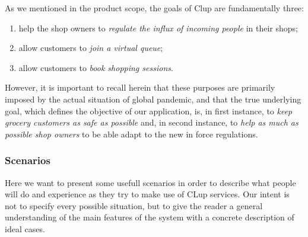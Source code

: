 As we mentioned in the product scope, the goals of Clup are fundamentally three: 
\begin{enumerate}[topsep=0pt]
    \item help the shop owners to \textit{regulate the influx of incoming people} in their shops;
    \item allow customers to \textit{join a virtual queue};
    \item allow customers to \textit{book shopping sessions}.
\end{enumerate}

However, it is important to recall herein that these purposes are primarily imposed by the actual situation of global pandemic, and that the true underlying goal, which defines the objective of our application, is, in first instance, to \textit{keep grocery customers as safe as possible} and, in second instance, to \textit{help as much as possible shop owners} to be able adapt to the new in force regulations.

\subsubsection{Scenarios}
\label{subsubsect:scenarios}

Here we want to present some usefull scenarios in order to describe what people will do and experience as they try to make use of CLup services. Our intent is not to specify every possible situation, but to give the reader a general understanding of the main features of the system with a concrete description of ideal cases.
 
